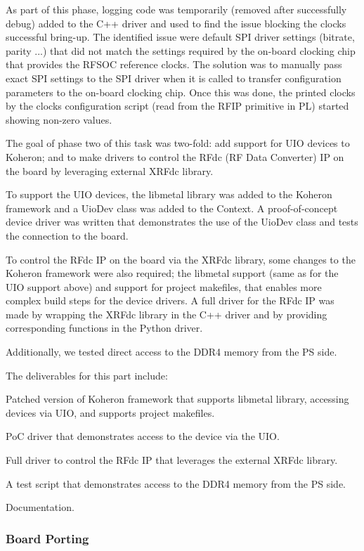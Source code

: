 \documentclass[preprint]{elsarticle}
\begin{document}
As part of this phase, logging code was temporarily (removed after successfully debug) added to the C++ driver and used to find the issue blocking the clocks successful bring-up. The identified issue were default SPI driver settings (bitrate, parity ...) that did not match the settings required by the on-board clocking chip that provides the RFSOC reference clocks. The solution was to manually pass exact SPI settings to the SPI driver when it is called to transfer configuration parameters to the on-board clocking chip. Once this was done, the printed clocks by the clocks configuration script (read from the RFIP primitive in PL) started showing non-zero values.

The goal of phase two of this task was two-fold: add support for UIO devices to Koheron; and to make drivers to control the RFdc (RF Data Converter) IP on the board by leveraging external XRFdc library.

To support the UIO devices, the libmetal library was added to the Koheron framework and a UioDev class was added to the Context. A proof-of-concept device driver was written that demonstrates the use of the UioDev class and tests the connection to the board.

To control the RFdc IP on the board via the XRFdc library, some changes to the Koheron framework were also required; the libmetal support (same as for the UIO support above) and support for project makefiles, that enables more complex build steps for the device drivers. A full driver for the RFdc IP was made by wrapping the XRFdc library in the C++ driver and by providing corresponding functions in the Python driver.

Additionally, we tested direct access to the DDR4 memory from the PS side.

The deliverables for this part include:

Patched version of Koheron framework that supports libmetal library, accessing devices via UIO, and supports project makefiles.

PoC driver that demonstrates access to the device via the UIO.

Full driver to control the RFdc IP that leverages the external XRFdc library.

A test script that demonstrates access to the DDR4 memory from the PS side.

Documentation.

\subsubsection{Board Porting}
\end{document}
